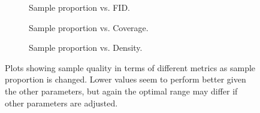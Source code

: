 \begin{figure}
    \begin{subfigure}[b]{0.33\textwidth}
        \centering
        \resizebox{\textwidth}{!}{
            
        }
        \caption{Sample proportion vs. FID.}
    \end{subfigure}
    \hfill
    \begin{subfigure}[b]{0.33\textwidth}
        \centering
        \resizebox{\textwidth}{!}{
            
        }
        \caption{Sample proportion vs. Coverage.}
    \end{subfigure}
    \hfill
    \begin{subfigure}[b]{0.33\textwidth}
        \centering
        \resizebox{\textwidth}{!}{
            
        }
        \caption{Sample proportion vs. Density.}
    \end{subfigure}
    \caption{
        Plots showing sample quality in terms of different metrics as sample
        proportion is changed. Lower values seem to perform better given the
        other parameters, but again the optimal range may differ if other
        parameters are adjusted.
    }
    \label{fig:prop}
\end{figure}

